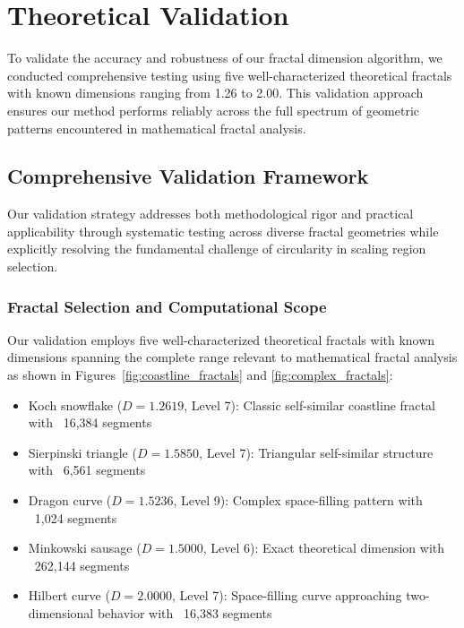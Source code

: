 \documentclass[preprint,12pt]{elsarticle}
\def\textbf#1{#1}%
\begin{document}
\section{Theoretical Validation}

To validate the accuracy and robustness of our fractal dimension algorithm, we conducted comprehensive testing using five well-characterized theoretical fractals with known dimensions ranging from 1.26 to 2.00. This validation approach ensures our method performs reliably across the full spectrum of geometric patterns encountered in mathematical fractal analysis.

\subsection{Comprehensive Validation Framework}
\label{subsec:validation_framework}

Our validation strategy addresses both methodological rigor and practical applicability through systematic testing across diverse fractal geometries while explicitly resolving the fundamental challenge of circularity in scaling region selection.

\subsubsection{Fractal Selection and Computational Scope}

Our validation employs five well-characterized theoretical fractals with known dimensions spanning the complete range relevant to mathematical fractal analysis as shown in Figures~\ref{fig:coastline_fractals} and \ref{fig:complex_fractals}:

\begin{itemize}
\item \textbf{Koch snowflake} ($D = 1.2619$, Level 7): Classic self-similar coastline fractal with ~16,384 segments
\item \textbf{Sierpinski triangle} ($D = 1.5850$, Level 7): Triangular self-similar structure with ~6,561 segments
\item \textbf{Dragon curve} ($D = 1.5236$, Level 9): Complex space-filling pattern with ~1,024 segments
\item \textbf{Minkowski sausage} ($D = 1.5000$, Level 6): Exact theoretical dimension with ~262,144 segments
\item \textbf{Hilbert curve} ($D = 2.0000$, Level 7): Space-filling curve approaching two-dimensional behavior with ~16,383 segments
\end{itemize}
\end{document}

